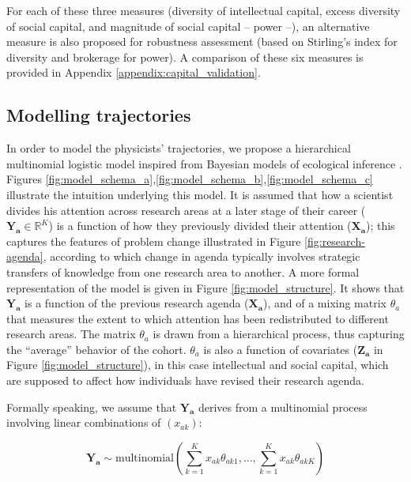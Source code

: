 \documentclass{article}
\begin{document}
For each of these three measures (diversity of intellectual capital, excess diversity of social capital, and magnitude of social capital -- power --), an alternative measure is also proposed for robustness assessment (based on Stirling's index for diversity and brokerage for power). A comparison of these six measures is provided in Appendix \ref{appendix:capital_validation}. 

\subsection{\label{sec:model}Modelling trajectories}

In order to model the physicists' trajectories, we propose a hierarchical multinomial logistic model inspired from Bayesian models of ecological inference \citep{RosJiaKin01}. Figures \ref{fig:model_schema_a},\ref{fig:model_schema_b},\ref{fig:model_schema_c} illustrate the intuition underlying this model. It is assumed that how a scientist divides his attention across research areas at a later stage of their career ($\bm{Y_{a}} \in \mathbb{R}^K$) is a function of how they previously divided their attention ($\bm{X_{a}}$); this captures the features of problem change illustrated in Figure \ref{fig:research-agenda}, according to which change in agenda typically involves strategic transfers of knowledge from one research area to another. A more formal representation of the model is given in Figure \ref{fig:model_structure}. It shows that $\bm{Y_{a}}$ is a function of the previous research agenda ($\bm{X_{a}}$), and of a mixing matrix $\theta_a$ that measures the extent to which attention has been redistributed to different research areas. The matrix $\theta_a$ is drawn from a hierarchical process, thus capturing the ``average'' behavior of the cohort. $\theta_a$ is also a function of covariates ($\bm{Z_a}$ in Figure \ref{fig:model_structure}), in this case intellectual and social capital, which are supposed to affect how individuals have revised their research agenda. %

Formally speaking, we assume that $\bm{Y_{a}}$ derives from a multinomial process involving linear combinations of $(x_{ak})$:

\begin{equation}
    \bm{Y_a} \sim \text{multinomial}(\sum_{k=1}^{K} x_{ak}\theta_{ak1} ,\dots,\sum_{k=1}^{K}x_{ak}\theta_{akK})
\end{equation}
\end{document}
